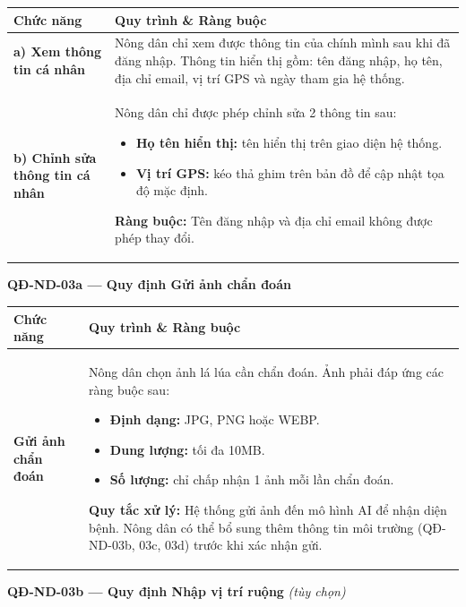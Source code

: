 \documentclass[12pt,a4paper]{article}
\begin{document}
\begin{longtable}{|
    >{\raggedright\arraybackslash}p{2.8cm}|
    >{\raggedright\arraybackslash}p{12cm}|}
\hline
\rowcolor{headerblue}
\textbf{Chức năng} & \textbf{Quy trình \& Ràng buộc} \\
\hline
\endhead
\textbf{a) Xem thông tin cá nhân} &
Nông dân chỉ xem được thông tin của chính mình sau khi đã đăng nhập. Thông tin hiển thị gồm: tên đăng nhập, họ tên, địa chỉ email, vị trí GPS và ngày tham gia hệ thống. \\
\hline
\textbf{b) Chỉnh sửa thông tin cá nhân} &
Nông dân chỉ được phép chỉnh sửa 2 thông tin sau:
\begin{itemize}[leftmargin=*,topsep=2pt,itemsep=1pt]
    \item \textbf{Họ tên hiển thị:} tên hiển thị trên giao diện hệ thống.
    \item \textbf{Vị trí GPS:} kéo thả ghim trên bản đồ để cập nhật tọa độ mặc định.
\end{itemize}
\textbf{Ràng buộc:} Tên đăng nhập và địa chỉ email không được phép thay đổi. \\
\hline
\end{longtable}
 
\vspace{0.3cm}
\noindent\textbf{QĐ-ND-03a --- Quy định Gửi ảnh chẩn đoán}
 
\begin{longtable}{|
    >{\raggedright\arraybackslash}p{2.8cm}|
    >{\raggedright\arraybackslash}p{12cm}|}
\hline
\rowcolor{headerblue}
\textbf{Chức năng} & \textbf{Quy trình \& Ràng buộc} \\
\hline
\endhead
\textbf{Gửi ảnh chẩn đoán} &
Nông dân chọn ảnh lá lúa cần chẩn đoán. Ảnh phải đáp ứng các ràng buộc sau:
\begin{itemize}[leftmargin=*,topsep=2pt,itemsep=1pt]
    \item \textbf{Định dạng:} JPG, PNG hoặc WEBP.
    \item \textbf{Dung lượng:} tối đa 10MB.
    \item \textbf{Số lượng:} chỉ chấp nhận 1 ảnh mỗi lần chẩn đoán.
\end{itemize}
\textbf{Quy tắc xử lý:} Hệ thống gửi ảnh đến mô hình AI để nhận diện bệnh. Nông dân có thể bổ sung thêm thông tin môi trường (QĐ-ND-03b, 03c, 03d) trước khi xác nhận gửi. \\
\hline
\end{longtable}
 
\vspace{0.3cm}
\noindent\textbf{QĐ-ND-03b --- Quy định Nhập vị trí ruộng} \textit{(tùy chọn)}
 
\end{document}
